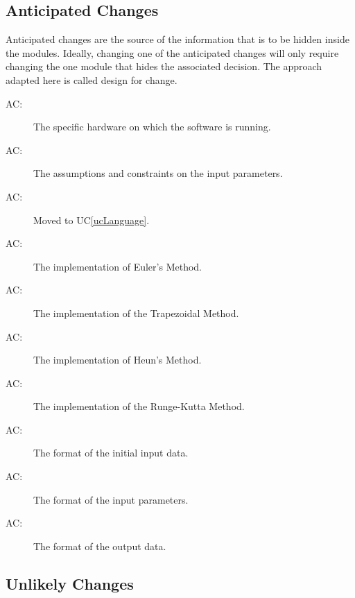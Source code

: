 \documentclass[12pt, titlepage]{article}
\newcounter{acnum}
\newcommand{\actheacnum}{AC\theacnum}
\begin{document}
\subsection{Anticipated Changes} \label{SecAchange}

Anticipated changes are the source of the information that is to be hidden
inside the modules. Ideally, changing one of the anticipated changes will only
require changing the one module that hides the associated decision. The approach
adapted here is called design for change.

\begin{description}
\item[ \actheacnum \label{acHardware}:] The specific
  hardware on which the software is running.
\item[ \actheacnum \label{acConstraints}:] The assumptions and constraints
on the input parameters.
\item[ \actheacnum \label{acLanguage}:] Moved to  UC\ref{ucLanguage}. 
  
\item[ \actheacnum \label{acEulerMethod}:] The implementation
of Euler's Method.
\item[ \actheacnum \label{acTrapMethod}:] The implementation
of the Trapezoidal Method.
\item[ \actheacnum \label{acHeunMethod}:] The implementation
of Heun's Method.
\item[ \actheacnum \label{acRKMethod}:] The implementation
of the Runge-Kutta Method.
\item[ \actheacnum \label{acInput}:] The format of the
  initial input data.
\item[ \actheacnum \label{acInputParams}:] The format
of the input parameters.
\item[ \actheacnum \label{acOutput}:] The format of the output data.

\end{description}

\subsection{Unlikely Changes} \label{SecUchange}
\end{document}
